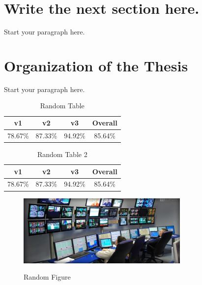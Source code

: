 \section{Write the next section here.}
Start your paragraph here. 

\section{Organization of the Thesis}
Start your paragraph here. 


\begin{table}[ht]
  \caption[Random Table]{Random Table}
  \begin{center}
    \begin{tabular}{cccc}
      \hline \textbf{v1} & \textbf{v2} & \textbf{v3} & \textbf{Overall} \\ \hline
        78.67\% & 87.33\% & 94.92\% & 85.64\% \\ \hline
    \end{tabular}
  \end{center}
  \label{tab:random_table}
\end{table} 

\begin{table}[ht]
  \caption[Random Table 2]{Random Table 2}
  \begin{center}
    \begin{tabular}{cccc}
      \hline \textbf{v1} & \textbf{v2} & \textbf{v3} & \textbf{Overall} \\ \hline
        78.67\% & 87.33\% & 94.92\% & 85.64\% \\ \hline
    \end{tabular}
  \end{center}
  \label{tab:random_table_2}
\end{table} 

\begin{figure}[ht]
  \centering
  \caption[Random Figure]{Random Figure}
  \includegraphics[width=0.75\textwidth]{figures/monitoring.pdf}
  \label{fig:random_figure}
\end{figure}